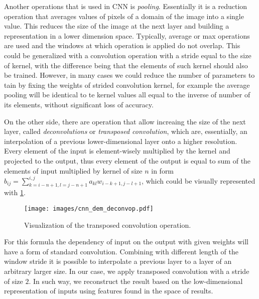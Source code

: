 Another operations that is used in CNN is \textit{pooling}.
Essentially it is a reduction operation that averages values of pixels of a domain of the image into a single value.
This reduces the size of the image at the next layer and building a representation in a lower dimension space. 
Typically, average or max operations are used and the windows at which operation is applied do not overlap.
This could be generalized with a convolution operation with a stride equal to the size of kernel, with the difference being that the elements of such kernel should also be trained.
However, in many cases we could reduce the number of parameters to tain by fixing the weights of strided convolution kernel, for example the average pooling will be identical to te kernel values all equal to the inverse of number of its elements, without significant loss of accuracy\cite{}.
\medskip


On the other side, there are operation that allow increaing the size of the next layer, called \emph{deconvolutions} or \textit{transposed convolution}, which are, essentially, an interpolation of a previous lower-dimensional layer onto a higher resolution.
Every element of the input is element-wisely multiplied by the kernel and projected to the output, thus every element of the output is equal to sum of the elements of input multiplied by kernel of size $n$ in form $b_{ij} = \sum_{k=i-n+1,l=j-n+1}^{i,j} a_{kl}w_{i-k+1,j-l+1}$, which could be visually represented with \ref{fig:deconv_op}.
\begin{figure}[ht]
	\centering
	\texttt{[image: images/cnn\_dem\_deconvop.pdf]}
	\label{fig:deconv_op}
	\caption{Visualization of the transposed convolution operation.}
\end{figure}
For this formula the dependency of input on the output with given weights will have a form of standard convolution.
Combining with different length of the window stride it is possible to interpolate a previous layer to a layer of an arbitrary larger size. 
In our case, we apply transposed convolution with a stride of size $2$.
In such way, we reconstruct the result based on the low-dimensional representation of inputs using features found in the space of results.

